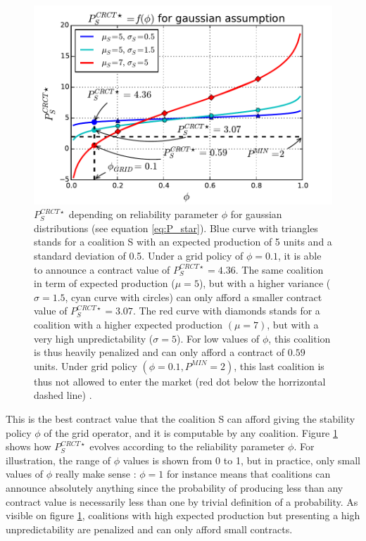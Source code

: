 \documentclass[conference]{IEEEtran}
\begin{document}
\begin{figure}
\includegraphics[scale=.6]{gaussian_P_star.pdf}
\caption{$ P_{S}^{CRCT \star} $ depending on reliability parameter $ \phi $ for gaussian distributions (see equation \ref{eq:P_star}). Blue curve with triangles stands for a coalition S with an expected production of 5 units and a standard deviation of 0.5. Under a grid policy of $ \phi = 0.1 $, it is able to announce a contract value of $ P_{S}^{CRCT \star} = 4.36 $. The same coalition in term of expected production ($\mu = 5 $), but with a higher variance ($ \sigma = 1.5 $, cyan curve with circles) can only afford a smaller contract value of $ P_{S}^{CRCT \star} = 3.07 $. The red curve with diamonds stands for a coalition with a higher expected production $(\mu = 7)$, but with a very high unpredictability ($ \sigma = 5 $). For low values of $ \phi $, this coalition is thus heavily penalized and can only afford a contract of $ 0.59 $ units. Under grid policy $ (\phi = 0.1, P^{MIN} = 2) $, this last coalition is thus not allowed to enter the market (red dot below the horrizontal dashed line)	. }
\label{fig:Gaussian}
\end{figure}

This is the best contract value that the coalition S can afford giving the stability policy $\phi$ of the grid operator, and it is computable by any coalition. Figure \ref{fig:Gaussian} shows how $ P_{S}^{CRCT \star} $ evolves according to the reliability parameter $ \phi $. For illustration, the range of $ \phi $ values is shown from 0 to 1, but in practice, only small values of $ \phi $ really make sense : $ \phi = 1 $ for instance means that coalitions can announce absolutely anything since the probability of producing less than any contract value is necessarily less than one by trivial definition of a probability. As visible on figure \ref{fig:Gaussian}, coalitions with high expected production but presenting a high unpredictability are penalized and can only afford small contracts.  
\end{document}
